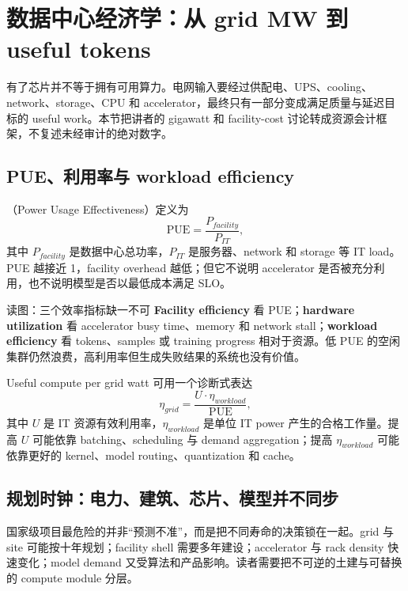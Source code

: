 \section{数据中心经济学：从 grid MW 到 useful tokens}

有了芯片并不等于拥有可用算力。电网输入要经过供配电、UPS、cooling、network、storage、CPU 和 accelerator，最终只有一部分变成满足质量与延迟目标的 useful work。本节把讲者的 gigawatt 和 facility-cost 讨论转成资源会计框架，不复述未经审计的绝对数字。

\subsection{PUE、利用率与 workload efficiency}

（Power Usage Effectiveness）定义为
\[
\mathrm{PUE}=\frac{P_{facility}}{P_{IT}},
\]
其中 $P_{facility}$ 是数据中心总功率，$P_{IT}$ 是服务器、network 和 storage 等 IT load。PUE 越接近 1，facility overhead 越低；但它不说明 accelerator 是否被充分利用，也不说明模型是否以最低成本满足 SLO。


\begin{knowledgebox}{读图：三个效率指标缺一不可}
\textbf{Facility efficiency} 看 PUE；\textbf{hardware utilization} 看 accelerator busy time、memory 和 network stall；\textbf{workload efficiency} 看 tokens、samples 或 training progress 相对于资源。低 PUE 的空闲集群仍然浪费，高利用率但生成失败结果的系统也没有价值。
\end{knowledgebox}

\begin{importantbox}{Useful compute per grid watt}
可用一个诊断式表达
\[
\eta_{grid}=\frac{U\cdot \eta_{workload}}{\mathrm{PUE}},
\]
其中 $U$ 是 IT 资源有效利用率，$\eta_{workload}$ 是单位 IT power 产生的合格工作量。提高 $U$ 可能依靠 batching、scheduling 与 demand aggregation；提高 $\eta_{workload}$ 可能依靠更好的 kernel、model routing、quantization 和 cache。
\end{importantbox}

\subsection{规划时钟：电力、建筑、芯片、模型并不同步}

国家级项目最危险的并非“预测不准”，而是把不同寿命的决策锁在一起。grid 与 site 可能按十年规划；facility shell 需要多年建设；accelerator 与 rack density 快速变化；model demand 又受算法和产品影响。读者需要把不可逆的土建与可替换的 compute module 分层。

